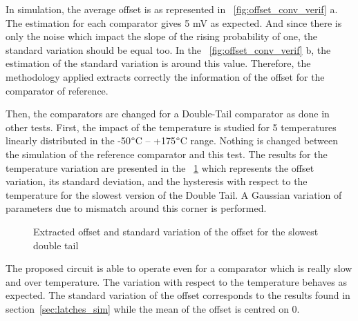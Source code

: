 In simulation, the average offset is as represented in \figurename~\ref{fig:offset_conv_verif} a. The estimation for each comparator gives 5 mV as expected. And since there is only the noise which impact the slope of the rising probability of one, the standard variation should be equal too. In the \figurename~\ref{fig:offset_conv_verif} b, the estimation of the standard variation is around this value. Therefore, the methodology applied extracts correctly the information of the offset for the comparator of reference.

Then, the comparators are changed for a Double-Tail comparator as done in other tests. First, the impact of the temperature is studied for 5 temperatures linearly distributed in the -50$\degree$C -- +175$\degree$C range. Nothing is changed between the simulation of the reference comparator and this test.
The results for the temperature variation are presented in the \figurename~\ref{fig:offset_conv_dtl} which represents the offset variation, its standard deviation, and the hysteresis with respect to the temperature for the slowest version of the Double Tail. A Gaussian variation of parameters due to mismatch around this corner is performed.

\begin{figure}[htp]
    \centering
    \begin{subfigure}[b]{0.32\textwidth}
    \end{subfigure}
    \begin{subfigure}[b]{0.32\textwidth}
    \end{subfigure}
    \begin{subfigure}[b]{0.32\textwidth}
    \end{subfigure}
    \caption{Extracted offset and standard variation of the offset for the slowest double tail}
    \label{fig:offset_conv_dtl}
\end{figure}

The proposed circuit is able to operate even for a comparator which is really slow and over temperature. The variation with respect to the temperature behaves as expected. The standard variation of the offset corresponds to the results found in section~\ref{sec:latches_sim} while the mean of the offset is centred on 0.

